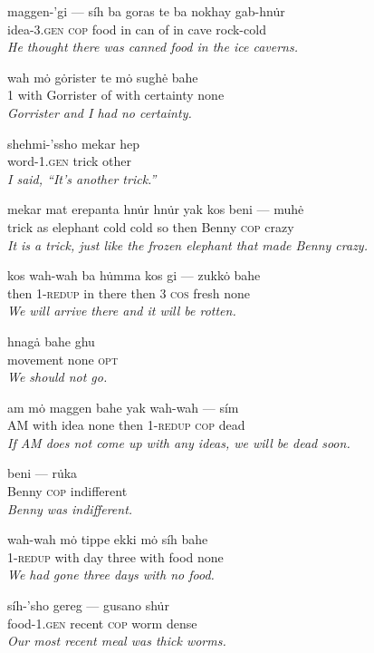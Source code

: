 \documentclass{article}[10pt]
\begin{document}
\begin{exe}
\ex 
\gll maggen-'gi --- s\'{i}h ba goras te ba nokhay gab-hn\.{u}r\\
idea-3.\textsc{gen} \textsc{cop} food in can of in cave rock-cold\\
\trans \emph{He thought there was canned food in the ice caverns.}

\ex
\gll wah m\.{o} g\.{o}rister te m\.{o} sugh\.{e} bahe\\
1 with Gorrister of with certainty none\\
\trans \emph{Gorrister and I had no certainty.}

\ex
\gll shehmi-'ssho mekar hep\\
word-1.\textsc{gen} trick other\\
\trans \emph{I said, ``It's another trick.''}

\ex
\gll mekar mat erepanta hn\.{u}r hn\.{u}r yak kos beni --- muh\.{e}\\
trick as elephant cold cold so then Benny \textsc{cop} crazy\\
\trans \emph{It is a trick, just like the frozen elephant that made Benny crazy.}

\ex
\gll kos wah-wah ba h\.{u}mma kos gi --- zukk\.{o} bahe\\
then 1-\textsc{redup} in there then 3 \textsc{cos} fresh none\\
\trans \emph{We will arrive there and it will be rotten.}

\ex
\gll hnag\.{a} bahe ghu\\
movement none \textsc{opt}\\
\trans \emph{We should not go.}

\ex
\gll am m\.{o} maggen bahe yak wah-wah --- s\'{i}m\\
AM with idea none then 1-\textsc{redup} \textsc{cop} dead\\
\trans \emph{If AM does not come up with any ideas, we will be dead soon.}


\ex 
\gll beni --- r\.{u}ka\\
Benny \textsc{cop} indifferent\\
\trans \emph{Benny was indifferent.}

\ex
\gll wah-wah m\.{o} tippe ekki m\.{o} s\'{i}h bahe\\
1-\textsc{redup} with day three with food none\\
\trans \emph{We had gone three days with no food.}

\ex
\gll s\'{i}h-'sho gereg --- gusano sh\.{u}r\\
food-1.\textsc{gen} recent \textsc{cop} worm dense\\
\trans \emph{Our most recent meal was thick worms.}


\end{exe}
\end{document}
